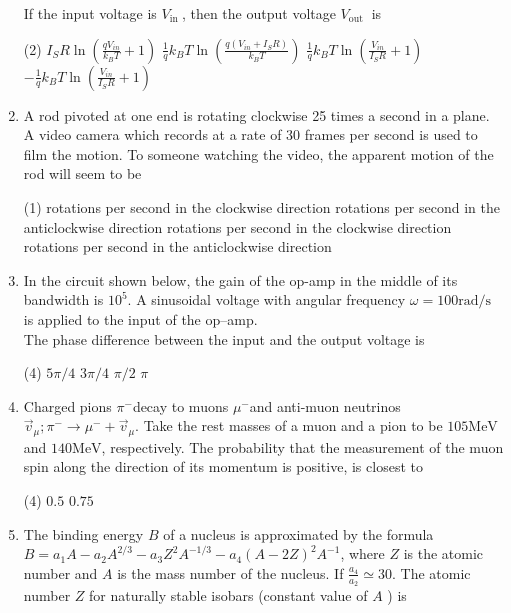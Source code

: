 \begin{enumerate}
If the input voltage is $V_{\text {in }}$, then the output voltage $V_{\text {out }}$ is
 \begin{tasks}(2)
	\task[\textbf{a.}]$I_{S} R \ln \left(\frac{q V_{i n}}{k_{B} T}+1\right)$
	\task[\textbf{b.}]$\frac{1}{q} k_{B} T \ln \left(\frac{q\left(V_{i n}+I_{S} R\right)}{k_{B} T}\right)$
	\task[\textbf{c.}]$\frac{1}{q} k_{B} T \ln \left(\frac{V_{i n}}{I_{S} R}+1\right)$
	\task[\textbf{d.}] $-\frac{1}{q} k_{B} T \ln \left(\frac{V_{i n}}{I_{S} R}+1\right)$
\end{tasks}
\item A rod pivoted at one end is rotating clockwise 25 times a second in a plane. A video camera which records at a rate of 30 frames per second is used to film the motion. To someone watching the video, the apparent motion of the rod will seem to be
 \begin{tasks}(1)
	 rotations per second in the clockwise direction
	 rotations per second in the anticlockwise direction
	 rotations per second in the clockwise direction
	 rotations per second in the anticlockwise direction
\end{tasks}
\item  In the circuit shown below, the gain of the op-amp in the middle of its bandwidth is $10^{5}$. A sinusoidal voltage with angular frequency $\omega=100 \mathrm{rad} / \mathrm{s}$ is applied to the input of the op--amp.\\
The phase difference between the input and the output voltage is
 \begin{tasks}(4)
	\task[\textbf{a.}]$5 \pi / 4$
	\task[\textbf{b.}]$3 \pi / 4$
	\task[\textbf{c.}]$\pi / 2$
	\task[\textbf{d.}]$\pi$ 
\end{tasks}
\item Charged pions $\pi^{-}$decay to muons $\mu^{-}$and anti-muon neutrinos $\vec{v}_{\mu} ; \pi^{-} \rightarrow \mu^{-}+\vec{v}_{\mu}$. Take the rest masses of a muon and a pion to be $105 \mathrm{MeV}$ and $140 \mathrm{MeV}$, respectively. The probability that the measurement of the muon spin along the direction of its momentum is positive, is closest to
 \begin{tasks}(4)
	\task[\textbf{a.}]$0.5$
	\task[\textbf{b.}]$0.75$
\end{tasks}
\item  The binding energy $B$ of a nucleus is approximated by the formula $B=a_{1} A-a_{2} A^{2 / 3}-a_{3} Z^{2} A^{-1 / 3}-a_{4}(A-2 Z)^{2} A^{-1}$, where $Z$ is the atomic number and $A$ is the mass number of the nucleus. If $\frac{a_{4}}{a_{2}} \simeq 30$. The atomic number $Z$ for naturally stable isobars (constant value of $A$ ) is

\end{enumerate}
